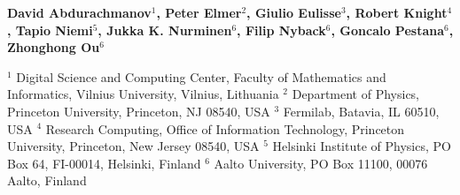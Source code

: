 \documentclass[portrait,a1,final]{a0poster} %
\begin{document}
\begin{minipage}[t]{1\linewidth}
\begin{minipage}[t]{0.7\linewidth}
\vspace{0.05\linewidth} %

\normalsize{\textsf{\bfseries{David Abdurachmanov$^1$, Peter Elmer$^2$, Giulio Eulisse$^3$, Robert Knight$^4$, Tapio Niemi$^5$, Jukka K. Nurminen$^6$, Filip Nyback$^6$, Goncalo Pestana$^6$, Zhonghong Ou$^6$}}}

{\footnotesize $^1$ Digital Science and Computing Center, Faculty of Mathematics and Informatics, Vilnius University, Vilnius, Lithuania $^2$ Department of Physics, Princeton University, Princeton, NJ 08540, USA $^3$ Fermilab, Batavia, IL 60510, USA $^4$ Research Computing, Office of Information Technology, Princeton University, Princeton, New Jersey 08540, USA $^5$ Helsinki Institute of Physics, PO Box 64, FI-00014, Helsinki, Finland $^6$ Aalto University, PO Box 11100, 00076 Aalto, Finland\par}


%
\end{minipage}
\end{minipage}



\vspace{0.03\linewidth}

\centering

\small %
\end{document}
